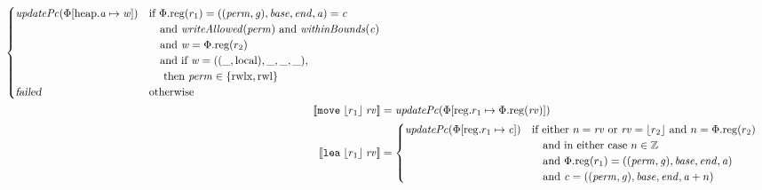 \documentclass[a4paper]{article}
\newcommand{\update}[2]{[#1 \mapsto #2]}
\newcommand{\sem}[1]{\left\llbracket #1 \right\rrbracket}
\newcommand{\var}[1]{\mathit{#1}}
\newcommand{\rv}{\var{rv}}
\newcommand{\gl}{\var{g}}
\newcommand{\addr}{\var{a}}
\newcommand{\start}{\var{base}}
\newcommand{\addrend}{\var{end}}
\newcommand{\perm}{\var{perm}}
\newcommand{\stdcap}[1][(\perm,\gl)]{\left(#1,\start,\addrend,\addr \right)}
\newcommand{\plainproj}[1]{\mathrm{#1}}
\newcommand{\memreg}[1][\Phi]{#1.\plainproj{reg}}
\newcommand{\updateHeap}[3][\Phi]{#1\update{\plainproj{heap}.#2}{#3}}
\newcommand{\updateReg}[3][\Phi]{#1\update{\plainproj{reg}.#2}{#3}}
\newcommand{\failed}{\textsl{failed}}
\newcommand{\plainfun}[2]{
  \ifthenelse{\equal{#2}{}}
             {\mathit{#1}}
             {\mathit{#1}(#2)}
}
\newcommand{\writeAllowed}[1]{\plainfun{writeAllowed}{#1}}
\newcommand{\withinBounds}[1]{\plainfun{withinBounds}{#1}}
\newcommand{\stdUpdatePc}[1]{\plainfun{updatePc}{#1}}
\newcommand{\ints}{\mathbb{Z}}
\newcommand{\refreg}[1]{\lfloor #1 \rfloor}
\newcommand{\zinstr}[1]{\mathtt{#1}}
\newcommand{\twoinstr}[3]{\zinstr{#1} \; #2 \; #3}
\newcommand{\move}[2]{\twoinstr{move}{#1}{#2}}
\newcommand{\lea}[2]{\twoinstr{lea}{#1}{#2}}
\newcommand{\plainperm}[1]{\mathrm{#1}}
\newcommand{\readwritel}{\plainperm{rwl}}
\newcommand{\rwlx}{\plainperm{rwlx}}
\newcommand{\local}{\plainperm{local}}
\begin{document}
\begin{align*}
                                             \begin{cases}
                                               \stdUpdatePc{\updateHeap{\addr}{\var{w}}} &
                                               \arraycolsep=0pt
                                               \begin{array}[t]{l}
                                                 \text{if }\memreg(r_1) = \stdcap = \var{c} \\
                                                 \quad\text{and }\writeAllowed{\perm} \text{ and } \withinBounds{\var{c}} \\
                                                 \quad\text{and }\var{w} = \memreg(r_2)\\
                                                 \quad\text{and if } \var{w} = ((\_,\local),\_,\_,\_) \text{,} \\
                                                 \quad\text{ then } \perm \in \{\rwlx,\readwritel \}
                                               \end{array}\\
                                               \failed & \text{otherwise }
                                             \end{cases}\\
 \sem{\move{\refreg{r_1}}{\rv}}            & = \stdUpdatePc{\updateReg{r_1}{\memreg(\rv)}}
\\
  \sem{\lea{\refreg{r_1}}{\rv}}            & =
                                             \begin{cases}
                                               \stdUpdatePc{\updateReg{r_1}{\var{c}}} &
                                                 \arraycolsep=0pt
                                                 \begin{array}[t]{l}
                                                   \text{if either $n = \rv$ or $\rv = \refreg{r_2}$ and $n = \memreg(r_2)$} \\
                                                   \quad\text{and in either case $n \in \ints $} \\
                                                   \quad\text{and $\memreg(r_1) = \stdcap$}\\
                                                   \quad\text{and $\var{c} = ((\perm,\gl),\start,\addrend,\addr + n)$}
                                                 \end{array}\\

\end{cases}
\end{align*}
\end{document}
